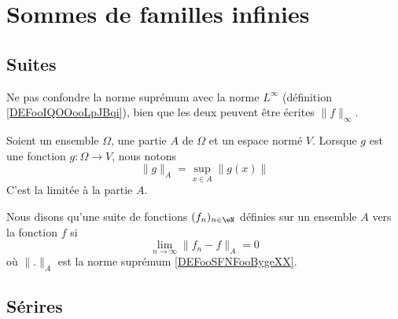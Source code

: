\section{Sommes de familles infinies}
\label{SECooHHDXooUgLhHR}

\subsection{Suites}


Ne pas confondre la norme suprémum avec la norme \( L^{\infty}\) (définition \ref{DEFooIQOOooLpJBqi}), bien que les deux peuvent être écrites \( \| f \|_{\infty}\).

\begin{definition}		\label{DEFooSFNFooBygeXX}
	Soient un ensemble \( \Omega\), une partie \( A\) de \( \Omega\) et un espace normé \( V\). Lorsque \( g\) est une fonction \( g\colon \Omega\to V\), nous notons
	\begin{equation}
		\| g \|_A=\sup_{x\in A}\| g(x) \|
	\end{equation}
	C'est la  limitée à la partie \( A\).
\end{definition}

\begin{definition}		\label{DEFooOHRYooWUsYTi}
	Nous disons qu'une suite de fonctions \( (f_n)_{n\in \eN}\) définies sur un ensemble \( A\)  vers la fonction \( f\) si
	\begin{equation}	\label{EQooGPPEooNKOtlx}
		\lim_{n\to \infty} \| f_n-f \|_A=0
	\end{equation}
	où \( \| . \|_A\) est la norme suprémum \ref{DEFooSFNFooBygeXX}.
\end{definition}



\subsection{Sérires}


